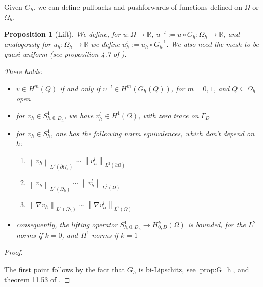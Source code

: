\documentclass[english,a4paper,9pt,oneside]{scrbook}	%
\theoremstyle{break}
\newtheorem{prop}[equation]{Proposition}
\newenvironment{mproof}[1][\proofname]{%
  \begin{proof}[#1]$ $\par\nobreak\ignorespaces
}{%
  \end{proof}
}
\renewcommand*{\proofname}{Proof}
\theoremstyle{remark}
\newcommand{\mR}{\mathbb{R}}
\newcommand{\norm}[1]{\left\lVert#1\right\rVert}
\begin{document}
\begin{appendices}
Given $G_h$, we can define pullbacks and pushforwards of functions defined on $\Omega$ or $\Omega_h$.


\begin{prop}[Lift]
\label{prop:lift}
We define, for $u: \Omega \rightarrow \mR$, $u^{-l}:=u\circ G_h : \Omega_h \rightarrow \mR$, and analogously for $u_h: \Omega_h \rightarrow \mR$ we define $u_h^l:=u_h\circ G_h^{-1}$. We also need the mesh to be quasi-uniform (see proposition 4.7 of \cite{elliott}).

There holds:

\begin{itemize}
	\item $v\in H^m(Q)$ if and only if $v^{-l} \in H^m(G_h(Q))$, for $m=0,1$, and $Q\subseteq \Omega_h$ open
	\item for $v_h \in S^1_{h,0,D_h}$, we have $v_h^l \in H^1(\Omega)$, with zero trace on $\Gamma_D$ 
	\item for $v_h  \in S^1_h$, one has the following norm equivalences, which don't depend on $h$:
	\begin{enumerate}
		\item $\norm{v_h}_{L^2(\partial \Omega_h)} \sim \norm{v_h^l}_{L^2(\partial \Omega)}$
		\item $\norm{v_h}_{L^2( \Omega_h)} \sim \norm{v_h^l}_{L^2( \Omega)}$
		\item $\norm{\nabla v_h}_{L^2( \Omega_h)} \sim \norm{\nabla v_h^l}_{L^2( \Omega)}$
	\end{enumerate}
	\item consequently, the lifting operator $S^{1}_{h,0,D_h}\rightarrow H^k_{0,D}(\Omega)$ is bounded, for the $L^2$ norms if $k=0$, and $H^1$ norms if $k=1$ 
	
\end{itemize}

\end{prop}

\begin{mproof}

The first point follows by the fact that $G_h$ is bi-Lipschitz, see \cref{prop:G_h}, and theorem 11.53 of \cite{leoni}.

%
%


\end{mproof}
\end{appendices}
\end{document}
